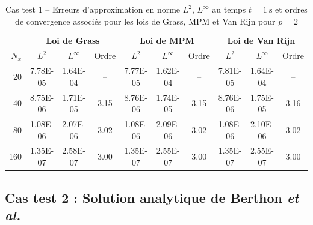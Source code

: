 \documentclass[11pt, a4paper, oneside]{report}
\begin{document}
\begin{table}[h!]
    \centering
    \small %
    \begin{tabular}{r ccc ccc ccc}
    \toprule
    & \multicolumn{3}{c}{\textbf{Loi de Grass}} & \multicolumn{3}{c}{\textbf{Loi de MPM}} & \multicolumn{3}{c}{\textbf{Loi de Van Rijn}} \\
    \cmidrule(lr){2-4} \cmidrule(lr){5-7} \cmidrule(lr){8-10}
    $N_x$ & $L^2$ & $L^\infty$ & Ordre & $L^2$ & $L^\infty$ & Ordre & $L^2$ & $L^\infty$ & Ordre \\
    \midrule
    20 & 7.78E-05 & 1.64E-04 & -- & 7.77E-05 & 1.62E-04 & -- & 7.81E-05 & 1.64E-04 & -- \\
    40 & 8.75E-06 & 1.71E-05 & 3.15 & 8.76E-06 & 1.74E-05 & 3.15 & 8.76E-06 & 1.75E-05 & 3.16 \\
    80 & 1.08E-06 & 2.07E-06 & 3.02 & 1.08E-06 & 2.09E-06 & 3.02 & 1.08E-06 & 2.10E-06 & 3.02 \\
    160 & 1.35E-07 & 2.58E-07 & 3.00 & 1.35E-07 & 2.55E-07 & 3.00 & 1.35E-07 & 2.55E-07 & 3.00 \\
    \bottomrule
    \end{tabular}
    \caption{Cas test 1 -- Erreurs d'approximation en norme $L^2$, $L^\infty$ au temps $t = \SI{1}{\second}$ et ordres de convergence associés pour les lois de Grass, MPM et Van Rijn pour $p = 2$}
    \label{tab:convergence_manufacturee}
\end{table}

\subsection{Cas test 2 : Solution analytique de Berthon \textit{et al.}}
\end{document}
